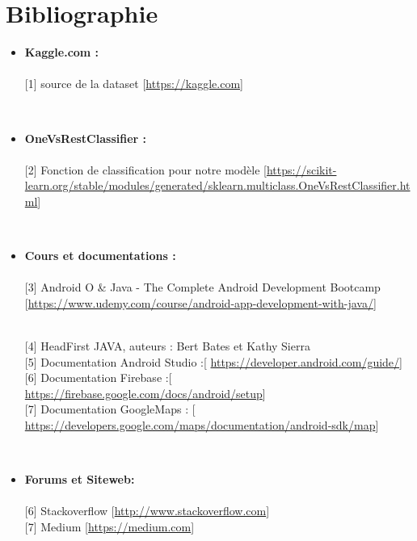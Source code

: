 \chapter*{Bibliographie}

\vspace{2cm}

\begin{itemize}

\\\item \textbf{\Large{Kaggle.com : }}\\
\\{[1]} source de la dataset [\url{https://kaggle.com}] \vspace{0.3cm}

\\\item \textbf{\Large{OneVsRestClassifier : }}\\
\\{[2]} Fonction de classification pour notre modèle [\url{https://scikit-learn.org/stable/modules/generated/sklearn.multiclass.OneVsRestClassifier.html}] \vspace{0.3cm}

\\\item \textbf{\Large{Cours et documentations : }}\\
\\{[3]} Android O & Java - The Complete Android Development Bootcamp  [\url{https://www.udemy.com/course/android-app-development-with-java/}] \vspace{0.3cm}

\\{[4]} HeadFirst JAVA, auteurs : Bert Bates et Kathy Sierra 
\vspace{0.3cm}
\\{[5]} Documentation Android Studio :[ \url{https://developer.android.com/guide/}]
\vspace{0.3cm}
\\{[6]} Documentation Firebase :[ \url{https://firebase.google.com/docs/android/setup}]
\vspace{0.3cm}
\\{[7]} Documentation GoogleMaps : [ \url{https://developers.google.com/maps/documentation/android-sdk/map}]
\vspace{1cm}

\\ \item \textbf{\Large{Forums et Siteweb:}}\\
\\{[6]} Stackoverflow [\url{http://www.stackoverflow.com}]
\vspace{0.3cm}
\\{[7]} Medium [\url{https://medium.com}]


\end{itemize}
